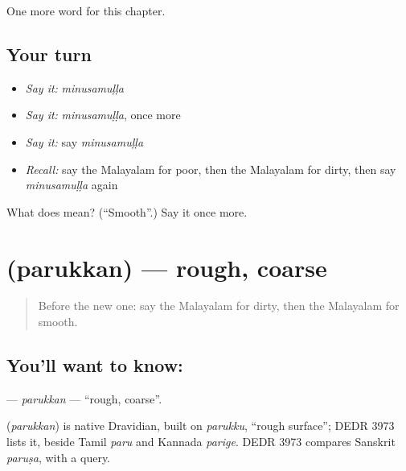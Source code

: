 \begin{grammarlens}[title={What you've built}]
One more word for this chapter.
\end{grammarlens}

\subsection*{Your turn}
\begin{itemize}
\raggedright
  \item \emph{Say it:} \emph{minusamuḷḷa}
  \item \emph{Say it:} \emph{minusamuḷḷa}, once more
  \item \emph{Say it:} say \emph{minusamuḷḷa}
  \item \emph{Recall:} say the Malayalam for poor, then the Malayalam for dirty, then say \emph{minusamuḷḷa} again
\end{itemize}

\begin{tcolorbox}[breakable,colback=teal!4,colframe=teal!35!black,title={Before you move on}]
What does  mean? (\textquotedblleft{}Smooth\textquotedblright{}.) Say it once more.
\end{tcolorbox}
\section[\texorpdfstring{\ml{പരുക്കൻ} (parukkan)}{പരുക്കൻ (parukkan)}]{ (parukkan) — rough, coarse}

\label{lesson:ML-C204-parukkan}



\begin{quote}
Before the new one: say the Malayalam for dirty, then the Malayalam for smooth.
\end{quote}

\subsection*{You'll want to know: }
\textbf{} — \emph{parukkan} — \textquotedblleft{}rough, coarse\textquotedblright{}.

\begin{cousinweb}
\textbf{} (\emph{parukkan}) is native Dravidian, built on \emph{parukku}, \textquotedblleft{}rough surface\textquotedblright{}; DEDR 3973 lists it, beside Tamil \emph{paru} and Kannada \emph{parige}. DEDR 3973 compares Sanskrit \emph{paruṣa}, with a query.
\end{cousinweb}

